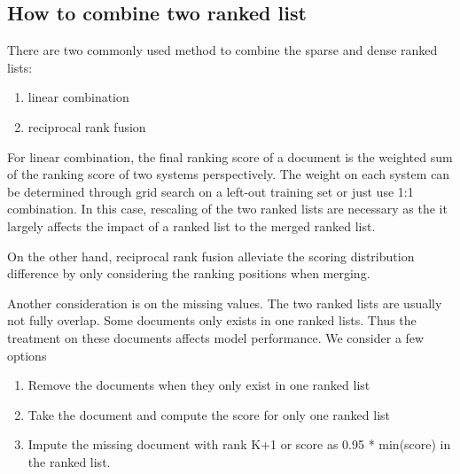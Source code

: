 {\subsection{How to combine two ranked list}
There are two commonly used method to combine the sparse and dense ranked lists:
\begin{enumerate}
    \item linear combination
    \item reciprocal rank fusion
\end{enumerate}
For linear combination, the final ranking score of a document is the weighted sum of the ranking score of two systems perspectively. The weight on each system can be determined through grid search on a left-out training set or just use 1:1 combination. In this case, rescaling of the two ranked lists are necessary as the it largely affects the impact of a ranked list to the merged ranked list. 

On the other hand, reciprocal rank fusion alleviate the scoring distribution difference by only considering the ranking positions when merging. 

Another consideration is on the missing values. The two ranked lists are usually not fully overlap. Some documents only exists in one ranked lists. Thus the treatment on these documents affects model performance. We consider a few options
\begin{enumerate}
    \item Remove the documents when they only exist in one ranked list
    \item  Take the document and compute the score for only one ranked list
    \item Impute the missing document with rank K+1 or score as 0.95 * min(score) in the ranked list.
\end{enumerate}
}

